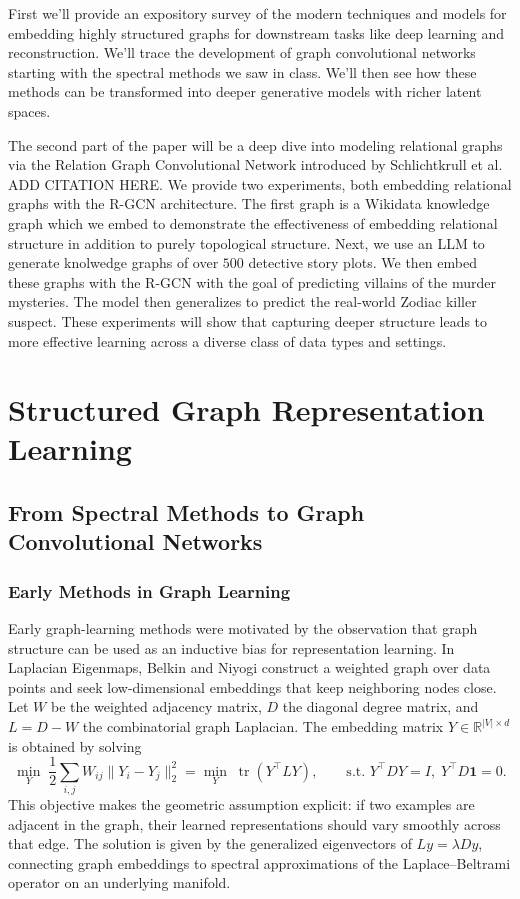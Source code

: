 \documentclass[11pt]{article}
\theoremstyle{definition}
\begin{document}
First we'll provide an expository survey of the modern techniques and models for embedding highly structured graphs for downstream tasks like deep learning and reconstruction. We'll trace the development of graph convolutional networks starting with the spectral methods we saw in class. We'll then see how these methods can be transformed into deeper generative models with richer latent spaces.

The second part of the paper will be a deep dive into modeling relational graphs via the Relation Graph Convolutional Network introduced by  Schlichtkrull et al. ADD CITATION HERE. We provide two experiments, both embedding relational graphs with the R-GCN architecture. The first graph is a Wikidata knowledge graph which we embed to demonstrate the effectiveness of embedding relational structure in addition to purely topological structure. Next, we use an LLM to generate knolwedge graphs of over $500$ detective story plots. We then embed these graphs with the R-GCN with the goal of predicting villains of the murder mysteries. The model then generalizes to predict the real-world Zodiac killer suspect. These experiments will show that capturing deeper structure leads to more effective learning across a diverse class of data types and settings. 




\section{Structured Graph Representation Learning}
\label{sec:background}

\subsection{From Spectral Methods to Graph Convolutional Networks}
\label{subsec:spectral}

\subsubsection{Early Methods in Graph Learning}
Early graph-learning methods were motivated by the observation that graph structure can be used as an inductive bias for representation learning. In Laplacian Eigenmaps, Belkin and Niyogi \cite{belkin2001laplacian} construct a weighted graph over data points and seek low-dimensional embeddings that keep neighboring nodes close. Let $W$ be the weighted adjacency matrix, $D$ the diagonal degree matrix, and $L = D - W$ the combinatorial graph Laplacian. The embedding matrix $Y \in \mathbb{R}^{|V| \times d}$ is obtained by solving
\[
    \min_Y \; \frac{1}{2}\sum_{i,j} W_{ij}\|Y_i - Y_j\|_2^2
    = \min_Y \; \operatorname{tr}(Y^\top L Y),
    \qquad
    \text{s.t. } Y^\top D Y = I, \; Y^\top D\mathbf{1}=0.
\]
This objective makes the geometric assumption explicit: if two examples are adjacent in the graph, their learned representations should vary smoothly across that edge. The solution is given by the generalized eigenvectors of $L y = \lambda D y$, connecting graph embeddings to spectral approximations of the Laplace--Beltrami operator on an underlying manifold.
\end{document}
